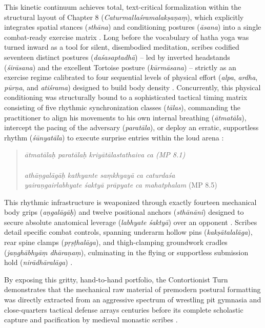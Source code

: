 \documentclass[11pt,twoside,letterpaper]{article}
\begin{document}
This kinetic continuum achieves total, text-critical formalization within the structural layout of Chapter 8 (\textit{Caturmallaśramalakṣaṇaṃ}), which explicitly integrates spatial stances (\textit{sthāna}) and conditioning postures (\textit{āsana}) into a single combat-ready exercise matrix \citep{MP_7}. Long before the vocabulary of hatha yoga was turned inward as a tool for silent, disembodied meditation, scribes codified seventeen distinct postures (\textit{daśasaptadhā}) -- led by inverted headstands (\textit{śirāsana}) and the excellent Tortoise posture (\textit{kūrmāsana}) -- strictly as an exercise regime calibrated to four sequential levels of physical effort (\textit{alpa}, \textit{ardha}, \textit{pūrṇa}, and \textit{atiśrama}) designed to build body density \citep{MP_7}. Concurrently, this physical conditioning was structurally bound to a sophisticated tactical timing matrix consisting of five rhythmic synchronization classes (\textit{tālas}), commanding the practitioner to align his movements to his own internal breathing (\textit{ātmatāla}), intercept the pacing of the adversary (\textit{paratāla}), or deploy an erratic, supportless rhythm (\textit{śūnyatāla}) to execute surprise entries within the loud arena \citep{MP_7}:

\begin{quote}
\small
\textit{ātmatālaḥ paratālaḥ kriyātālastathaiva ca (MP 8.1)  \\
\\
athāṇgalāgāḥ kathyante saṃkhyayā ca caturdaśa  \\
yairaṇgairlabhyate śaktyā prāpyate ca mahatphalam} (MP 8.5)
\end{quote}

This rhythmic infrastructure is weaponized through exactly fourteen mechanical body grips (\textit{aṇgalāgāḥ}) and twelve positional anchors (\textit{sthānāni}) designed to secure absolute anatomical leverage (\textit{labhyate śaktyā}) over an opponent \citep{MP_7}. Scribes detail specific combat controls, spanning underarm hollow pins (\textit{kakṣātalalāga}), rear spine clamps (\textit{pṛṣṭhalāga}), and thigh-clamping groundwork cradles (\textit{jaṇghābhyāṃ dhāraṇaṃ}), culminating in the flying or supportless submission hold (\textit{nirādhāralāga}) \citep{MP_7}. 

By exposing this gritty, hand-to-hand portfolio, the Contortionist Turn demonstrates that the mechanical raw material of premodern postural formatting was directly extracted from an aggressive spectrum of wrestling pit gymnasia and close-quarters tactical defense arrays centuries before its complete scholastic capture and pacification by medieval monastic scribes \citep{MP_7, Wujastyk2025}.
\end{document}
